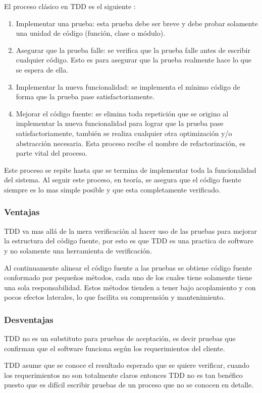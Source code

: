 El proceso clásico en TDD es el siguiente \cite{12_rappin_2010}:
\begin{enumerate}
\item Implementar una prueba: esta prueba debe ser breve y debe probar
  solamente una unidad de código (función, clase o módulo).
\item Asegurar que la prueba falle: se verifica que la prueba falle antes
  de escribir cualquier código. Esto es para asegurar que la prueba realmente
  hace lo que se espera de ella.
\item Implementar la nueva funcionalidad: se implementa el mínimo código de
  forma que la prueba pase satisfactoriamente.
\item Mejorar el código fuente: se elimina toda repetición que se origino al
  implementar la nueva funcionalidad para lograr que la prueba pase
  satisfactoriamente, también se realiza cualquier otra optimización y/o
  abstracción necesaria. Esta proceso recibe el nombre de
  refactorización, es parte vital del proceso.
\end{enumerate}

Este proceso se repite hasta que se termina de implementar toda la funcionalidad
del sistema. Al seguir este proceso, en teoría, se asegura que el código fuente
siempre es lo mas simple posible y que esta completamente verificado.

\subsubsection{Ventajas}
TDD va mas allá de la mera verificación al hacer uso de las pruebas para
mejorar la estructura del código fuente, por esto es que TDD es una practica
de software y no solamente una herramienta de verificación.

Al continuamente alinear el código fuente a las pruebas se obtiene código fuente
conformado por pequeños métodos, cada uno de los cuales tiene solamente tiene
una sola responsabilidad. Estos métodos tienden a tener bajo acoplamiento y
con pocos efectos laterales, lo que facilita su comprensión y mantenimiento.

\subsubsection{Desventajas}
TDD no es un substituto para pruebas de aceptación, es decir pruebas que confirman
que el software funciona según los requerimientos del cliente.

TDD asume que se conoce el resultado esperado que se quiere verificar,
cuando los requerimientos no son totalmente claros entonces TDD no es tan benéfico
puesto que es difícil escribir pruebas de un proceso que no se conocen en detalle.

